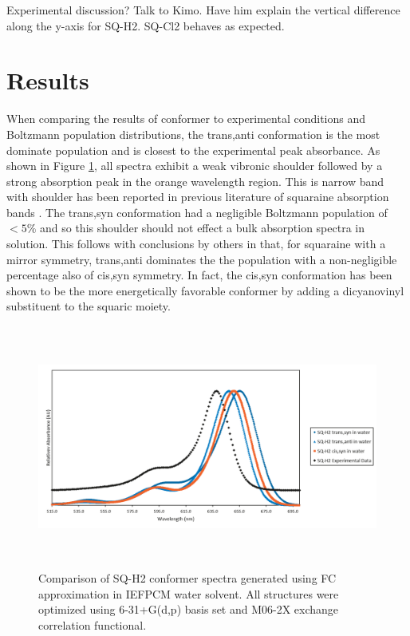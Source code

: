 \documentclass[journal=jacsat,manuscript=article]{achemso}
\begin{document}
Experimental discussion? Talk to Kimo. Have him explain the vertical difference along the y-axis for SQ-H2. SQ-Cl2 behaves as expected.

\section{Results}
When comparing the results of conformer to experimental conditions and Boltzmann population distributions, the trans,anti conformation is the most dominate population and is closest to the experimental peak absorbance. As shown in Figure \ref{fig:SQ1 conformers}, all spectra exhibit a weak vibronic shoulder followed by a strong absorption peak in the orange wavelength region. This is narrow band with shoulder has been reported in previous literature of squaraine absorption bands \citep{Qin2013ACells,Zheng2015ContributionDevices,Yang2017ThePerformance,Borrelli2014TheoreticalDye,Kuster2015CoupledPendulums,Brixner2017ExcitonSystems}. The trans,syn conformation had a negligible Boltzmann population of $<5\%$ and so this shoulder should not effect a bulk absorption spectra in solution. This follows with conclusions by others in that, for squaraine with a mirror symmetry, trans,anti dominates the the population with a non-negligible percentage also of cis,syn symmetry\cite{Borrelli2014TheoreticalDye}. In fact, the cis,syn conformation has been shown to be the more energetically favorable conformer by adding a dicyanovinyl substituent to the squaric moiety\cite{Qin2013ACells}.  


\begin{figure}[h]
    \centering
    \includegraphics[width=16cm,height=8cm]{figures/sq1_conformer_exp.png}
    \caption{Comparison of SQ-H2 conformer spectra generated using FC approximation in IEFPCM water solvent. All structures were optimized  using 6-31+G(d,p) basis set and M06-2X exchange correlation functional.}
    \label{fig:SQ1 conformers}
\end{figure}
\end{document}

